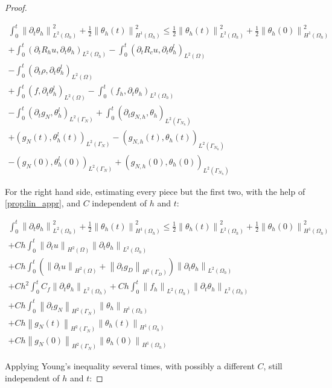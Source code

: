 \documentclass[english,a4paper,9pt,oneside]{scrbook}	%
\theoremstyle{break}
\newenvironment{mproof}[1][\proofname]{%
  \begin{proof}[#1]$ $\par\nobreak\ignorespaces
}{%
  \end{proof}
}
\renewcommand*{\proofname}{Proof}
\theoremstyle{remark}
\newcommand{\norm}[1]{\left\lVert#1\right\rVert}
\begin{document}
\begin{appendices}
\begin{mproof}
\begin{align*}
\int_0^t\norm{\partial_t \theta_h}^2_{L^2(\Omega_h)} + \frac{1}{2} \norm{\theta_h(t)}_{H^1(\Omega_h)}^2 \leq  \frac{1}{2} \norm{\theta_h(t)}_{L^2(\Omega_h)}^2 + \frac{1}{2} \norm{\theta_h(0)}_{H^1(\Omega_h)}^2\\
+\int_0^t(\partial_t R_h u , \partial_t\theta_h)_{L^2(\Omega_h)} - \int_0^t(\partial_t R_c u , \partial_t\theta_h^l)_{L^2(\Omega)}\\
- \int_0^t(\partial_t \rho, \partial_t\theta_h^l)_{L^2(\Omega)}\\ + \int_0^t(f, \partial_t\theta_h^l)_{L^2(\Omega)} - \int_0^t(f_h, \partial_t\theta_h)_{L^2(\Omega_h)}\\ 
-\int_0^t( \partial_t g_{N},\theta_h^l)_{L^2(\Gamma_{N})} + \int_0^t( \partial_t g_{N,h},\theta_h)_{L^2(\Gamma_{N_h})}\\
+ (g_{N}(t) ,\theta_h^l(t))_{L^2(\Gamma_{N})} - ( g_{N,h}(t),\theta_h(t))_{L^2(\Gamma_{N_h})}\\
-(g_{N}(0) ,\theta_h^l(0))_{L^2(\Gamma_{N})} + ( g_{N,h}(0),\theta_h(0))_{L^2(\Gamma_{N_h})}
\end{align*}

For the right hand side, estimating every piece but the first two, with the help of \cref{prop:lin_appr}, and $C$ independent of $h$ and $t$: 

\begin{align*}
\int_0^t\norm{\partial_t \theta_h}^2_{L^2(\Omega_h)} + \frac{1}{2} \norm{\theta_h(t)}_{H^1(\Omega_h)}^2 \leq  \frac{1}{2} \norm{\theta_h(t)}_{L^2(\Omega_h)}^2 + \frac{1}{2} \norm{\theta_h(0)}_{H^1(\Omega_h)}^2\\
+ Ch\int_0^t \norm{\partial_t u}_{H^2(\Omega)}\norm{\partial_t \theta_h}_{L^2(\Omega_h)}\\
+ Ch\int_0^t(\norm{\partial_t u}_{H^2(\Omega)}+	\norm{\partial_t g_D}_{H^2(\Gamma_D)})\norm{\partial_t \theta_h}_{L^2(\Omega_h)}\\
+ Ch^2\int_0^t C_f\norm{\partial_t \theta_h}_{L^2(\Omega_h)}+ Ch\int_0^t \norm{f_h}_{L^2(\Omega_h)}\norm{\partial_t \theta_h}_{L^2(\Omega_h)}\\ 
+ Ch\int_0^t \norm{\partial_t g_N}_{H^2(\Gamma_N)}\norm{ \theta_h}_{H^1(\Omega_h)}\\
+ Ch\norm{g_N(t)}_{H^2(\Gamma_N)}\norm{ \theta_h(t)}_{H^1(\Omega_h)}\\
+ Ch\norm{g_N(0)}_{H^2(\Gamma_N)}\norm{ \theta_h(0)}_{H^1(\Omega_h)}
\end{align*}

Applying Young's inequality several times, with possibly a different $C$, still independent of $h$ and $t$:


\end{mproof}
\end{appendices}
\end{document}
